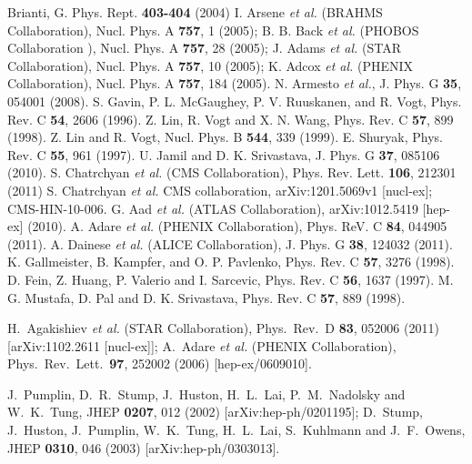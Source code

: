 \begin{thebibliography}{999}
 Brianti, G. Phys. Rept. {\bf 403-404} (2004)
 I. Arsene {\it et al.} (BRAHMS Collaboration), Nucl. Phys. A 
{\bf 757}, 1 (2005); B. B. Back {\it et al.} (PHOBOS Collaboration ), Nucl. 
Phys. A {\bf 757}, 28 (2005); J. Adams {\it et al.} (STAR Collaboration), Nucl. 
Phys. A {\bf 757}, 10 (2005); K. Adcox {\it et al.} (PHENIX Collaboration), 
Nucl. Phys. A {\bf 757}, 184 (2005).
 N. Armesto {\it et al.}, J. Phys. G {\bf 35}, 
054001 (2008).
 S. Gavin, P. L. McGaughey, P. V. Ruuskanen, and R. Vogt,
               Phys. Rev. C {\bf 54}, 2606 (1996).
 Z. Lin, R. Vogt and X. N. Wang, Phys. Rev. C {\bf 57}, 899 (1998).
 Z. Lin and R. Vogt, Nucl. Phys. B {\bf 544}, 339 (1999).
 E. Shuryak, Phys. Rev. C {\bf 55}, 961 (1997).  %
 U. Jamil and D. K. Srivastava, J. Phys. G {\bf 37}, 085106 (2010).
 S. Chatrchyan {\it et al.} (CMS Collaboration), Phys. Rev. 
Lett. {\bf 106}, 212301 (2011)
  S. Chatrchyan {\it et al.} CMS collaboration, 
arXiv:1201.5069v1 [nucl-ex]; CMS-HIN-10-006.
 G. Aad {\it et al.} (ATLAS Collaboration), arXiv:1012.5419 
[hep-ex] (2010).
 A. Adare {\it et al.} (PHENIX Collaboration), Phys. ReV. C
{\bf 84}, 044905 (2011).
 A. Dainese {\it et al.} (ALICE Collaboration), J. Phys. G
{\bf 38}, 124032 (2011).
 K. Gallmeister, B. Kampfer, and O. P. Pavlenko,
                Phys. Rev. C {\bf 57}, 3276 (1998).
 D. Fein, Z. Huang, P. Valerio and I. Sarcevic, Phys. Rev. C 
{\bf 56}, 1637 (1997).
 M. G. Mustafa, D. Pal and D. K. Srivastava, Phys. Rev. C 
{\bf 57}, 889 (1998).

 H.~Agakishiev {\it et al.}  (STAR Collaboration),
  Phys.\ Rev.\ D {\bf 83}, 052006 (2011)
  [arXiv:1102.2611 [nucl-ex]]; A.~Adare {\it et al.}  (PHENIX Collaboration),
  Phys.\ Rev.\ Lett.\  {\bf 97}, 252002 (2006)
  [hep-ex/0609010].

 J.~Pumplin, D.~R.~Stump, J.~Huston, H.~L.~Lai, P.~M.~Nadolsky 
and W.~K.~Tung,
  JHEP {\bf 0207}, 012 (2002)
  [arXiv:hep-ph/0201195];
  D.~Stump, J.~Huston, J.~Pumplin, W.~K.~Tung, H.~L.~Lai, S.~Kuhlmann 
  and J.~F.~Owens,
  JHEP {\bf 0310}, 046 (2003) 
  [arXiv:hep-ph/0303013].


\end{thebibliography}
